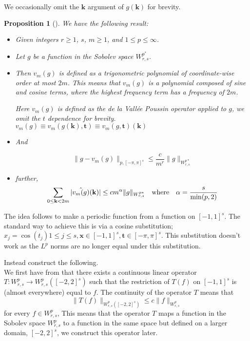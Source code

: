 \documentclass[11pt,a4paper]{article}
\theoremstyle{plain}
\newtheorem{proposition}[theorem]{Proposition}
\theoremstyle{definition}
\theoremstyle{remark}
\numberwithin{equation}{section}
\begin{document}
We occasionally omit the \(\mathbf{k} \) argument of \(g(\mathbf{k} )\) for brevity.

\begin{proposition}[\cite{prop3.1 Mhaskar}]
\label{prop31}
We have the following result:
\begin{itemize}
    \item  Given integers \( r \geq 1 \), \( s \), \( m \geq 1 \), and \( 1 \leq p \leq \infty \).
    \item  Let \( g \) be a function in the Sobolev space \( W^{p^{\ast}}_{r,s} \).
    
    \item Then \( v_m(g) \) is defined as a trigonometric polynomial of coordinate-wise order at most \( 2m \). This means that \( v_m(g) \) is a polynomial composed of sine and cosine terms, where the highest frequency term has a frequency of \( 2m \).
    
    Here \( v_m(g) \) is defined as the de la Vallée Poussin operator applied to \( g \), we omit the \(t\) dependence for brevity. \(v_{m}(g) \equiv v_{m}(g(\mathbf{k} ), \mathbf{t} )\equiv v_{m}(g,\mathbf{t} )(\mathbf{k} )\) 
    \item And 

    \begin{equation}
        \|g - v_m(g)\|_{p, [-\pi, \pi]^s} \leq \frac{c}{m^r} \|g\|_{W^{p*}_{r,s}}
        \label{keyInequality}
    \end{equation}
    \item further,
    \begin{equation}
        \sum_{0 \leq \mathbf{k} < 2m} |\Hat{v_m(g)}(\mathbf{k})| \leq cm^\alpha \|g\|_{W^{p*}_{r,s}}  \quad \text{where} \quad \alpha = \frac{s}{\min(p,2)} 
    \end{equation}
\end{itemize}
\end{proposition}

The idea follows to make a periodic function from a function on \([-1,1]^s\). The standard way to achieve this is via a cosine substitution; \(x_{j} = \cos (t_{j}) 1 \leq j \leq s, \mathbf{x} \in [-1,1]^s, \mathbf{t} \in [-\pi ,\pi ]^s\). This substitution doesn't work as the \(L^p\) norms are no longer equal under this substitution.

Instead construct the following.\\
We first have from \cite{Stein 1970} that there exists a continuous linear operator \( T: W_{r,s}^{p} \to W_{r,s}^{p}([-2,2]^s) \) such that the restriction of \( T(f) \) on \( [-1,1]^s \) is (almost everywhere) equal to \( f \). The continuity of the operator \( T \) means that
\[
    \|T(f)\|_{W_{r,s}^{p}([-2,2]^s)} \leq c \|f\|_{W_{r,s}^{p}}  
\]
for every \(f \in W_{r,s}^{p}\), This means that the operator \( T \) maps a function in the Sobolev space \( W_{r,s}^{p} \) to a function in the same space but defined on a larger domain, \( [-2, 2]^s \), we construct this operator later.
\end{document}
